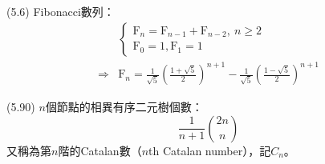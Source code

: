 \item \begin{theorem}{(5.6)} Fibonacci數列：\begin{equation}
    \begin{aligned}
        & 
        \begin{cases}
            \text{F}_n = \text{F}_{n - 1} + \text{F}_{n - 2}, \ n \ge 2 \\
            \text{F}_0 = 1, \text{F}_1 = 1
        \end{cases} \\
        \Rightarrow & \text{F}_n = \frac{1}{\sqrt{5}}(\frac{1 + \sqrt{5}}{2})^{n + 1} - \frac{1}{\sqrt{5}}(\frac{1 - \sqrt{5}}{2})^{n + 1}
    \end{aligned}
    \end{equation}
\end{theorem}

\item \begin{theorem}{(5.90)} $n$個節點的相異有序二元樹個數：\begin{equation}
        \frac{1}{n + 1}\binom{2n}{n}
    \end{equation}
    又稱為第$n$階的Catalan數（$n$th Catalan number），記$C_n$。
\end{theorem}